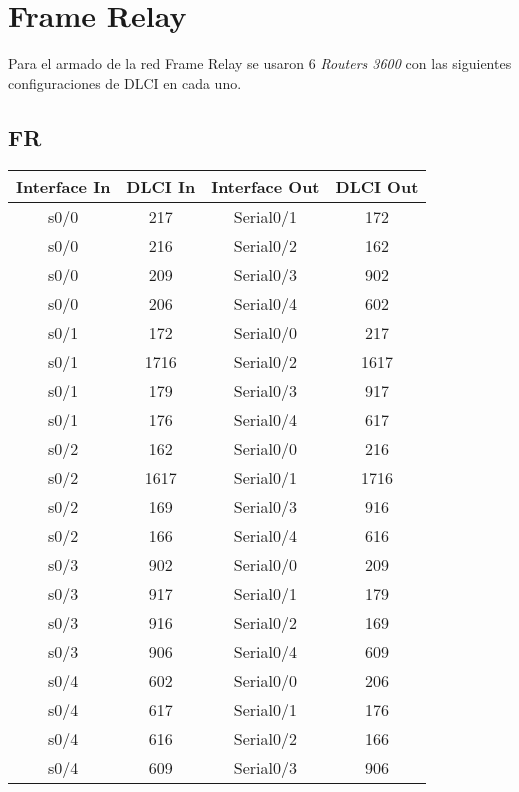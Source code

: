 \documentclass[12pt,a4paper,spanish]{article}
\begin{document}



\newpage
\section{Frame Relay}
Para el armado de la red Frame Relay se usaron 6 \emph{Routers 3600}
con las siguientes configuraciones de DLCI en cada uno.
\subsection{FR}
\begin{tabular}{|c|c|c|c|}
\hline
Interface In & DLCI In & Interface Out & DLCI Out \\
\hline
\hline
 s0/0 & 217 & Serial0/1 & 172 \\
\hline
 s0/0 & 216 & Serial0/2 & 162 \\
\hline
 s0/0 & 209 & Serial0/3 & 902 \\
\hline
 s0/0 & 206 & Serial0/4 & 602 \\
\hline
 s0/1 & 172 & Serial0/0 & 217 \\
\hline
 s0/1 & 1716 & Serial0/2 & 1617 \\
\hline
 s0/1 & 179 & Serial0/3 & 917 \\
\hline
 s0/1 & 176 & Serial0/4 & 617 \\
\hline
 s0/2 & 162 & Serial0/0 & 216 \\
\hline
 s0/2 & 1617 & Serial0/1 & 1716 \\
\hline
 s0/2 & 169 & Serial0/3 & 916 \\
\hline
 s0/2 & 166 & Serial0/4 & 616 \\
\hline
 s0/3 & 902 & Serial0/0 & 209 \\
\hline
 s0/3 & 917 & Serial0/1 & 179 \\
\hline
 s0/3 & 916 & Serial0/2 & 169 \\
\hline
 s0/3 & 906 & Serial0/4 & 609 \\
\hline
 s0/4 & 602 & Serial0/0 & 206 \\
\hline
 s0/4 & 617 & Serial0/1 & 176 \\
\hline
 s0/4 & 616 & Serial0/2 & 166 \\
\hline
 s0/4 & 609 & Serial0/3 & 906 \\
\hline

\end{tabular}
\end{document}
